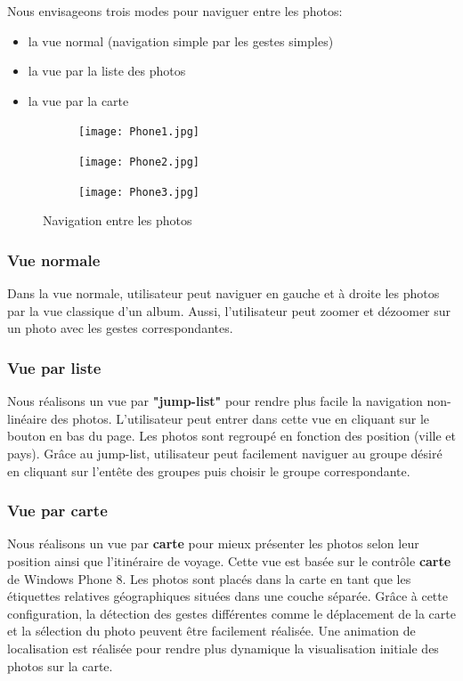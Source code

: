 \documentclass{article}
\begin{document}
Nous envisageons trois modes pour naviguer entre les photos: 

\begin{itemize}
\item la vue normal (navigation simple par les gestes simples)
\item la vue par la liste des photos
\item la vue par la carte
\end{itemize}

\begin{figure}[h!]
\centering
\begin{subfigure}{.3\textwidth}
  \centering
  \texttt{[image: Phone1.jpg]}
\end{subfigure}%
\begin{subfigure}{.3\textwidth}
  \centering
  \texttt{[image: Phone2.jpg]}
\end{subfigure}
\begin{subfigure}{.3\textwidth}
  \centering
  \texttt{[image: Phone3.jpg]}
\end{subfigure}
  \caption{Navigation entre les photos}
\end{figure}

\vspace{0.2 cm}
\subsubsection{\large Vue normale}
Dans la vue normale, utilisateur peut naviguer en gauche et à droite les photos par la vue classique d'un album. Aussi, l'utilisateur peut zoomer et dézoomer sur un photo avec les gestes correspondantes.

\vspace{0.2 cm}
\subsubsection{\large Vue par liste}
Nous réalisons un vue par \textbf{"jump-list"} pour rendre plus facile la navigation non-linéaire des photos. L'utilisateur peut entrer dans cette vue en cliquant sur le bouton en bas du page. Les photos sont regroupé en fonction des position (ville et pays). Grâce au jump-list, utilisateur peut facilement naviguer au groupe désiré en cliquant sur l'entête des groupes puis choisir le groupe correspondante.  

\vspace{0.2 cm}
\subsubsection{\large Vue par carte}
Nous réalisons un vue par \textbf{carte} pour mieux présenter les photos selon leur position ainsi que l'itinéraire de voyage. Cette vue  est basée sur le contrôle  \textbf{carte} de Windows Phone 8. Les photos sont placés dans la carte en tant que les étiquettes relatives géographiques situées dans une couche séparée. Grâce à cette configuration, la détection des gestes différentes comme le déplacement de la carte et la sélection du photo peuvent être facilement réalisée.  Une animation de localisation est réalisée pour rendre plus dynamique la visualisation initiale des photos sur la carte.
\newpage
\end{document}
